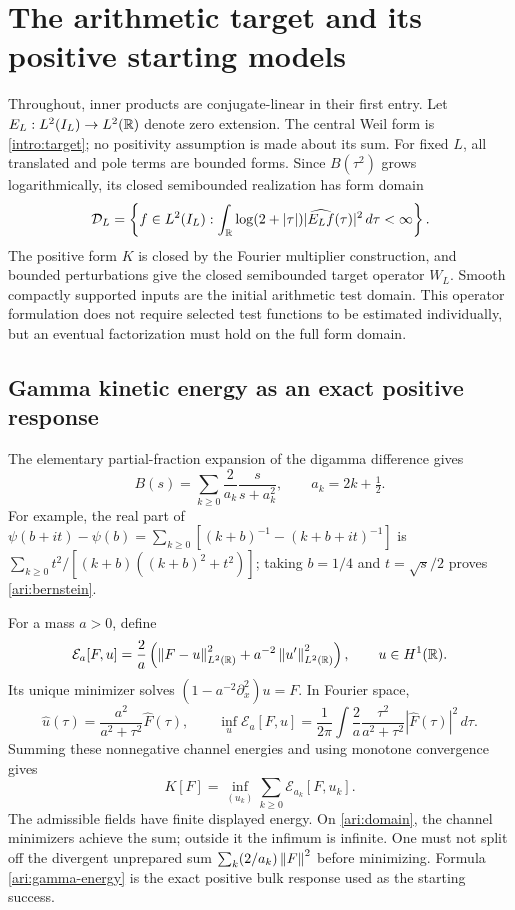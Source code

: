 \section{The arithmetic target and its positive starting models}
\label{sec:arithmetic}
Throughout, inner products are conjugate-linear in their first entry. Let $E_L:L^2(I_L)\to L^2(\mathbb R)$ denote zero extension. The central Weil form is \eqref{intro:target}; no positivity assumption is made about its sum. For fixed $L$, all translated and pole terms are bounded forms. Since $B(\tau^2)$ grows logarithmically, its closed semibounded realization has form domain
\begin{equation}\label{ari:domain}
\mathcal D_L=\left\{f\in L^2(I_L):
\int_{\mathbb R}\log(2+|\tau|)|\widehat{E_Lf}(\tau)|^2\,d\tau<\infty\right\}.
\end{equation}
The positive form $K$ is closed by the Fourier multiplier construction, and bounded perturbations give the closed semibounded target operator $W_L$. Smooth compactly supported inputs are the initial arithmetic test domain. This operator formulation does not require selected test functions to be estimated individually, but an eventual factorization must hold on the full form domain.

\subsection{Gamma kinetic energy as an exact positive response}
The elementary partial-fraction expansion of the digamma difference gives
\begin{equation}\label{ari:bernstein}
B(s)=\sum_{k\ge0}\frac2{a_k}\frac{s}{s+a_k^2},\qquad
 a_k=2k+\tfrac12.
\end{equation}
For example, the real part of
$\psi(b+it)-\psi(b)=\sum_{k\ge0}[(k+b)^{-1}-(k+b+it)^{-1}]$
is $\sum_{k\ge0}t^2/[(k+b)((k+b)^2+t^2)]$; taking $b=1/4$ and $t=\sqrt{s}/2$ proves \eqref{ari:bernstein}.

For a mass $a>0$, define
\[
\mathcal E_a[F,u]=\frac2a\left(\left\lVert F-u\right\rVert_{L^2(\mathbb R)}^2+a^{-2}\left\lVert u'\right\rVert_{L^2(\mathbb R)}^2\right),
\qquad u\in H^1(\mathbb R).
\]
Its unique minimizer solves $(1-a^{-2}\partial_x^2)u=F$. In Fourier space,
\[
\widehat u(\tau)=\frac{a^2}{a^2+\tau^2}\widehat F(\tau),
\qquad
\inf_u\mathcal E_a[F,u]
=\frac1{2\pi}\int\frac2a\frac{\tau^2}{a^2+\tau^2}|\widehat F(\tau)|^2\,d\tau.
\]
Summing these nonnegative channel energies and using monotone convergence gives
\begin{equation}\label{ari:gamma-energy}
K[F]=\inf_{(u_k)}\sum_{k\ge0}\mathcal E_{a_k}[F,u_k].
\end{equation}
The admissible fields have finite displayed energy. On \eqref{ari:domain}, the channel minimizers achieve the sum; outside it the infimum is infinite. One must not split off the divergent unprepared sum $\sum_k(2/a_k)\left\lVert F\right\rVert^2$ before minimizing. Formula \eqref{ari:gamma-energy} is the exact positive bulk response used as the starting success.

